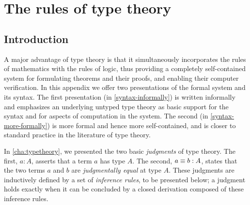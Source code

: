 
\chapter{The rules of type theory}

\label{cha:rules}
\bgroup %

\newcommand{\ctx}{\ \mathsf{ctx}}
\newcommand{\emptyctx}{\ensuremath{\cdot}}

\newcommand{\production}{\vcentcolon\vcentcolon=}

\newcommand{\mkbox}[1]{\ensuremath{#1}}

\newcommand{\app}{\mathsf{app}}

\newcommand{\gothic}{\mathfrak}
\newcommand{\gP}{{\gothic p}}
\newcommand{\gM}{{\gothic M}}
\newcommand{\gN}{{\gothic N}}
\newcommand{\rats}{\mathbb{Q}}
\newcommand{\ints}{\mathbb{Z}}

\newcommand{\lbr}{\lbrack\!\lbrack}
\newcommand{\rbr}{\rbrack\!\rbrack}
\newcommand{\sem}[2] {\lbr #1 \rbr_{#2}}  %
\newcommand{\APP}[2] {{\sf app}(#1,#2)}  %
\newcommand{\nats}{\mathbb{N}}
\newcommand{\Con}{{\sf Con}}
\newcommand{\Elem}{{\sf Elem}}
\newcommand{\myId}{1}
\newcommand{\mypp}{{\sf p}}
\newcommand{\qq}{{\sf q}}
\newcommand{\mySp}{{\sf Sp}}
\newcommand{\conv}{\sim}
\newcommand{\LIM}{{\sf lim}}
\newcommand{\nn}{{\sf n}}
\newcommand{\Fam}{{\sf Fam}}

\section{Introduction}\label{formal-intro}

A major advantage of type theory is that it 
simultaneously incorporates the rules of mathematics with the rules of logic,
thus providing a completely self-contained system for formulating theorems
and their proofs, and enabling their computer verification.  In this appendix we
offer two presentations of the formal system and its syntax.  The first
presentation (in \autoref{syntax-informally}) is written informally and
emphasizes an underlying untyped type theory as basic support for the syntax
and for aspects of computation in the system.  The second (in
\autoref{syntax-more-formally}) is more formal and hence more self-contained,
and is closer to standard practice in the literature of type theory.

In \autoref{cha:typetheory}, we presented the two basic {\em judgments} of type
theory. The first, $a:A$, asserts that a term $a$ has type $A$.  The second,
$a\equiv b:A$, states that the two terms $a$ and $b$ are {\em judgmentally equal}
at type $A$. These judgments are inductively defined by a set of {\em inference
rules}, to be presented below; a judgment holds exactly when it can be concluded
by a closed derivation composed of these inference rules.

